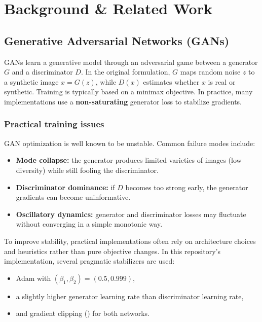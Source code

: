 \section{Background \& Related Work}

\subsection{Generative Adversarial Networks (GANs)}

GANs learn a generative model through an adversarial game between a generator \(G\) and a discriminator \(D\). In the original formulation, \(G\) maps random noise \(z\) to a synthetic image \(x = G(z)\), while \(D(x)\) estimates whether \(x\) is real or synthetic. Training is typically based on a minimax objective. In practice, many implementations use a \textbf{non-saturating} generator loss to stabilize gradients.

\subsubsection{Practical training issues}

GAN optimization is well known to be unstable. Common failure modes include:
\begin{itemize}
\item \textbf{Mode collapse:} the generator produces limited varieties of images (low diversity) while still fooling the discriminator.
\item \textbf{Discriminator dominance:} if \(D\) becomes too strong early, the generator gradients can become uninformative.
\item \textbf{Oscillatory dynamics:} generator and discriminator losses may fluctuate without converging in a simple monotonic way.
\end{itemize}

To improve stability, practical implementations often rely on architecture choices and heuristics rather than pure objective changes. In this repository's implementation, several pragmatic stabilizers are used:
\begin{itemize}
\item Adam with \((\beta_1, \beta_2) = (0.5, 0.999)\),
\item a slightly higher generator learning rate than discriminator learning rate,
\item and gradient clipping () for both networks.
\end{itemize}

